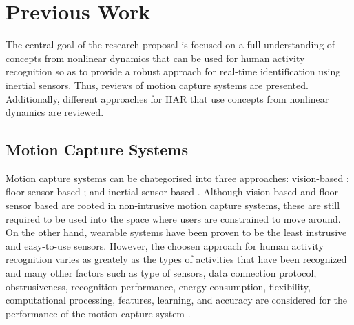 
\chapter{Previous Work}

\ifpdf
    \graphicspath{{Chapter2/Figs/Raster/}{Chapter2/Figs/PDF/}{Chapter2/Figs/}}
\else
    \graphicspath{{Chapter2/Figs/Vector/}{Chapter2/Figs/}}
\fi

The central goal of the research proposal is focused on a full understanding of 
concepts from nonlinear dynamics that can be used for human activity recognition 
so as to provide a robust approach for real-time identification using inertial sensors.
Thus, reviews of motion capture systems are presented. Additionally, 
different approaches for HAR 
that use concepts from nonlinear dynamics are reviewed. 

\section{Motion Capture Systems}
Motion capture systems can be chategorised into three approaches: 
vision-based \cite{Forsyth2005}; 
floor-sensor based
\cite{Paradiso1997,Steinhage2008,Aguilar2007,Wimmer2011,Yin2003,Moere2004,
Richardson2004,Srinivasan2005, Rangarajan2008,Visell2010, Rajalingham2010}
; and inertial-sensor based
\cite{Razak2012,Bamberg2008,Benocci2009,Xu2012,Holleczek2010}.
Although vision-based and floor-sensor based are rooted in non-intrusive 
motion capture systems, these are still required to be used into the space 
where users are constrained to move around.
On the other hand, wearable systems have been proven to be the least instrusive 
and easy-to-use sensors. However, the choosen approach for human activity 
recognition varies as greately as the 
types of activities that have been recognized 
and many other factors such as type of sensors, data connection protocol, obstrusiveness, 
recognition performance, energy consumption, flexibility, computational processing,
features, learning, and accuracy 
are considered for the performance of the motion capture system \cite{Lara2013}.

